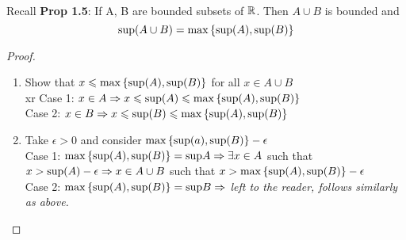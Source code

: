 \\

Recall \textbf{Prop 1.5}: 	If A, B are bounded subsets of $\mathbb{R}$. Then $A\cup B$ is bounded and
\[\mathrm{sup}(A\cup B) = \mathrm{max}\left\{ \mathrm{sup}(A), \mathrm{sup}(B) \right\}\]

\begin{proof}
  \begin{enumerate}[1]
    \item Show that $x \leqslant \mathrm{max}\left\{ \mathrm{sup}(A), \mathrm{sup}(B) \right\}$ for all $x\in A\cup B$ \\xr
    Case 1: $x\in A \Rightarrow x \leqslant \mathrm{sup}(A) \leqslant \mathrm{max}\left\{ \mathrm{sup}(A),\mathrm{sup}(B) \right\}$ \\
    Case 2: $x\in B \Rightarrow x \leqslant \mathrm{sup}(B) \leqslant \mathrm{max}\left\{ \mathrm{sup}(A),\mathrm{sup}(B) \right\}$

    \item Take $\epsilon > 0$ and consider $\mathrm{max}\left\{ \mathrm{sup}(a), \mathrm{sup}(B) \right\}-\epsilon$ \\
    Case 1: $\mathrm{max}\left\{ \mathrm{sup}(A), \mathrm{sup}(B) \right\}=\mathrm{sup} A \Rightarrow \exists x\in A$ such that $x>\mathrm{sup}(A)-\epsilon \Rightarrow x \in A\cup B $ such that $x>\mathrm{max}\left\{ \mathrm{sup}(A), \mathrm{sup}(B) \right\}-\epsilon$ \\
    Case 2: $\mathrm{max}\left\{ \mathrm{sup}(A), \mathrm{sup}(B) \right\}=\mathrm{sup} B \Rightarrow $ \textit{left to the reader, follows similarly as above. }
  \end{enumerate}
\end{proof}

